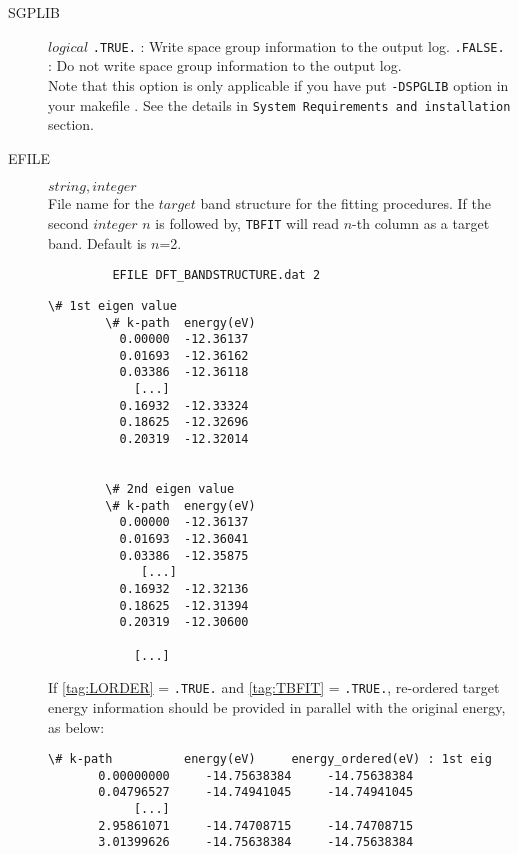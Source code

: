 \documentclass[a4paper,12pt]{scrartcl}
\makeatletter
\def\namedlabel#1#2{\begingroup
    #2%
    \def\@currentlabel{#2}%
    \phantomsection\label{#1}\endgroup
}
\newcommand{\tbfitname}{\textcolor{blue!85!white}{\texttt{TBFIT}}}
\newcommand{\textblue}[1]{\textcolor{blue!85!white}{\texttt{#1}}}
\makeatother
\begin{document}
\begin{description}
    \item[\namedlabel{tag:SPGLIB}{SGPLIB}] $logical$ 
		\subitem \texttt{.TRUE.}  : Write space group information to the output log.
		\subitem \texttt{.FALSE.}  : Do not write space group information to the output log. \\
		
		Note that this option is only applicable if you have put \textblue{-DSPGLIB} option in your makefile . See the details in \texttt{System Requirements and installation} section.
	
    \item[\namedlabel{tag:EFILE}{EFILE}] $string, integer$  \\
		File name for the $target$ band structure for the fitting procedures. 
		If the second $integer$ $n$ is followed by,
		\tbfitname{} will read $n$-th column as a target band. Default is $n$=2.
		\begin{verbatim}
		 EFILE DFT_BANDSTRUCTURE.dat 2
		\end{verbatim}

		\begin{Verbatim}[commandchars=\\\{\},gobble=4, frame=single, framesep=2mm, 
		   	label= EFILE DFT\_BANDSTRUCTURE.out example ,
		   	labelposition=bottomline]
        \# 1st eigen value
        \# k-path  energy(eV)
          0.00000  -12.36137  
          0.01693  -12.36162  
          0.03386  -12.36118  
            [...]
          0.16932  -12.33324  
          0.18625  -12.32696  
          0.20319  -12.32014  


        \# 2nd eigen value
        \# k-path  energy(eV)
          0.00000  -12.36137  
          0.01693  -12.36041  
          0.03386  -12.35875  
             [...]
          0.16932  -12.32136  
          0.18625  -12.31394  
          0.20319  -12.30600  

            [...]
		\end{Verbatim}
		
		If \ref{tag:LORDER} = \texttt{.TRUE.} and  \ref{tag:TBFIT} = \texttt{.TRUE.}, re-ordered target energy information should be provided in parallel with the original energy, as below:
		\begin{Verbatim}[commandchars=\\\{\},gobble=4, frame=single, framesep=2mm, 
		   	label= EFILE DFT\_BANDSTRUCTURE\_ORDERED.out example ,
		   	labelposition=bottomline] 
		  \# k-path          energy(eV)     energy_ordered(eV) : 1st eig
       0.00000000     -14.75638384     -14.75638384
       0.04796527     -14.74941045     -14.74941045
            [...]
       2.95861071     -14.74708715     -14.74708715
       3.01399626     -14.75638384     -14.75638384


\end{Verbatim}
\end{description}
\end{document}
